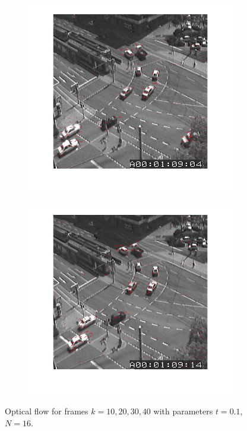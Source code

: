 \documentclass[a4paper]{iacas}
\begin{document}
\begin{figure}[!htbp]
	\begin{subfigure}[b]{0.4\textwidth}
		\includegraphics[width=\textwidth]{304.jpg}
		\caption{}
		\label{fig:304}
	\end{subfigure}
	\begin{subfigure}[b]{0.4\textwidth}
		\includegraphics[width=\textwidth]{305.jpg}
		\caption{}
		\label{fig:305}
	\end{subfigure}
	
	\caption{Optical flow for frames $k=10, 20, 30,40$ with parameters $t=0.1$, $N=16$.}
	\label{fig:300}
\end{figure}
\end{document}

